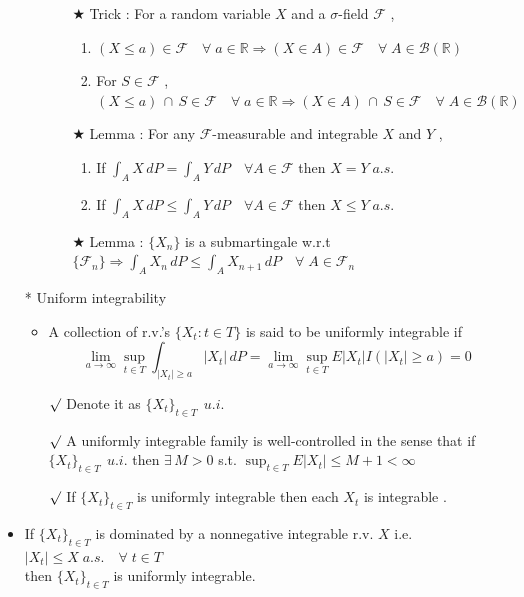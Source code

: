 \documentclass[12pt, A4]{article}
\newcommand{\rmk}{$\surd$}
\newcommand{\trick}{$\bigstar$}
\newcommand{\R}{\mathbb{R}}
\newcommand{\B}{\mathcal{B}}
\newcommand{\F}{\mathcal{F}}
\newcommand{\intersect}{\,\cap\,}
\newcommand{\exist}{\exists\,}
\begin{document}
\begin{itemize}
\begin{itemize}
		\begin{itemize}
			\item[\trick] Trick : For a random variable $X$ and a $\sigma$-field $\F$ ,
			\begin{enumerate}
				\item $(X\leq a)\in \F \quad \forall \; a\in \R\Rightarrow (X\in A)\in \F \quad \forall \; A\in \B(\R)$
				\item For $S\in \F$ , $(X\leq a)\intersect S\in \F \quad \forall \; a\in \R\Rightarrow (X\in A)\intersect S \in \F \quad \forall \; A\in \B(\R)$
			\end{enumerate}
			\item[\trick] Lemma : For any $\F$-measurable and integrable $X$ and $Y$ ,
			\begin{enumerate}
				\item If $\int_A X\, dP=\int_A Y \, dP\quad \forall A\in \F$ then $X=Y\; a.s.$ 
				\item If $\int_A X\, dP \leq \int_A Y \, dP\quad \forall A\in \F$ then $X\leq Y\; a.s.$ 
			\end{enumerate}
			\item[\trick] Lemma : $\{X_n\}$ is a submartingale w.r.t $\{\F_n\} \Rightarrow \int_A X_n\, dP \leq \int_A X_{n+1}\, dP\quad \forall\; A\in \F_n$
		\end{itemize} 
	\end{itemize}
	\item[*] Uniform integrability
	\begin{itemize}
		\item A collection of r.v.'s $\{X_t : t\in T\}$ is said to be uniformly integrable if 
		$$
			\lim_{a\rightarrow \infty} \sup_{t\in T} \int_{|X_t|\geq a}|X_t|\,dP = \lim_{a\rightarrow \infty} \sup_{t\in T} E|X_t|I(|X_t|\geq a) =0
		$$
		\item[\rmk] Denote it as $\{X_t\}_{t\in T}\;\,u.i.$
		\item[\rmk] A uniformly integrable family is well-controlled in the sense that if $\{X_t\}_{t\in T}\;\,u.i.$ then $\exist M>0$ s.t. $\sup_{t\in T}E|X_t|\leq M+1<\infty$
		\item[\rmk] If $\{X_t\}_{t\in T}$ is uniformly integrable then each $X_t$ is integrable .
	\end{itemize}
	\item If $\{X_t\}_{t\in T}$ is dominated by a nonnegative integrable r.v. $X$ \;i.e. $|X_t|\leq X\;a.s.\quad \forall\;t\in T$ \\ then $\{X_t\}_{t\in T}$ is uniformly integrable.
	\begin{itemize}

\end{itemize}
\end{itemize}
\end{document}

